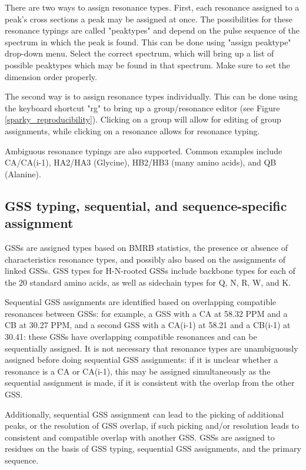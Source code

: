 There are two ways to assign resonance types.  First, each resonance assigned
to a peak's cross sections a peak may be assigned at once.  The possibilities
for these resonance typings are called "peaktypes" and depend on the pulse 
sequence of the spectrum in which the peak is found.
This can be done using "assign peaktype" drop-down menu.  Select the correct
spectrum, which will bring up a list of possible peaktypes which may be found
in that spectrum.  Make sure to set the dimension order properly.

The second way is to assign resonance types individually.  This can be done 
using the keyboard shortcut "rg" to bring up a group/resonance editor
(see Figure \ref{sparky_reproducibility}).  Clicking on a group will allow
for editing of group assignments, while clicking on a resonance allows for
resonance typing.

Ambiguous resonance typings are also supported.  Common examples include
CA/CA(i-1), HA2/HA3 (Glycine), HB2/HB3 (many amino acids), and QB (Alanine).

\subsection*{GSS typing, sequential, and sequence-specific assignment}
GSSs are assigned types based on BMRB statistics, the presence or absence of
characteristics resonance types, and possibly also based on the assignments 
of linked GSSs.
GSS types for H-N-rooted GSSs include backbone types for each of the 20 
standard amino acids, as well as sidechain types for Q, N, R, W, and K.

Sequential GSS assignments are identified based on overlapping compatible
resonances between GSSs: for example, a GSS with a CA at 58.32 PPM and a CB
at 30.27 PPM, and a second GSS with a CA(i-1) at 58.21 and a CB(i-1) at 30.41:
these GSSs have overlapping compatible resonances and can be sequentially
assigned.
It is not necessary that resonance types are unambiguously assigned before
doing sequential GSS assignments: if it is unclear whether a resonance is a
CA or CA(i-1), this may be assigned simultaneously as the sequential assignment
is made, if it is consistent with the overlap from the other GSS.

Additionally, sequential GSS assignment can lead to the picking of additional
peaks, or the resolution of GSS overlap, if such picking and/or resolution
leads to consistent and compatible overlap with another GSS.
GSSs are assigned to residues on the basis of GSS typing, sequential GSS
assignments, and the primary sequence.

